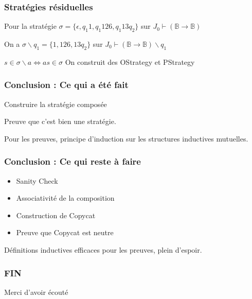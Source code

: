\documentclass{beamer}
\begin{document}
\begin{frame}
\frametitle{Stratégies résiduelles}

Pour la stratégie $\sigma = \{\epsilon, q_1 1, q_1 1 2 6, q_1 1 3 q_2\}$ sur $J_0 \vdash (\mathbb{B} \rightarrow \mathbb{B})$


On a $\sigma \backslash q_1 = \{1, 1 2 6, 1 3 q_2\}$ sur $J_0 \vdash (\mathbb{B} \rightarrow \mathbb{B})\backslash q_1$


$s \in \sigma \backslash a \iff as \in \sigma$
\pause
On construit des OStrategy et PStrategy
\end{frame}

\begin{frame}
\frametitle{Conclusion : Ce qui a été fait}

Construire la stratégie composée
\pause

Preuve que c'est bien une stratégie.
\pause

Pour les preuves, principe d'induction sur les structures inductives mutuelles.
\end{frame}

\begin{frame}
\frametitle{Conclusion : Ce qui reste à faire}

\begin{itemize}
\item Sanity Check
\pause
\item Associativité de la composition
\pause
\item Construction de Copycat
\pause
\item Preuve que Copycat est neutre
\end{itemize}
\pause
Définitions inductives efficaces pour les preuves, plein d'espoir.
\end{frame}

\begin{frame}
\frametitle{FIN}

Merci d'avoir écouté
\end{frame}
\end{document}
